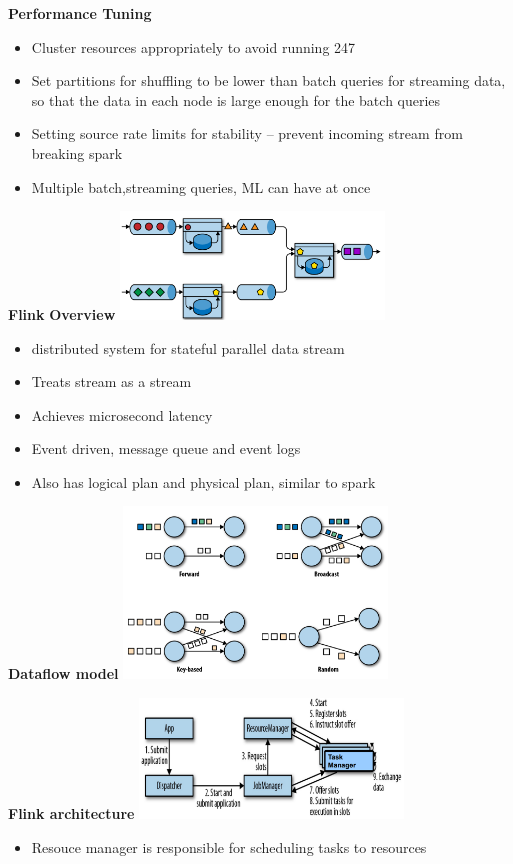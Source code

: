 \documentclass[10pt, landscape]{article}
\begin{document}
\begin{multicols}{4}
\textbf{Performance Tuning}
\begin{itemize}
  \item Cluster resources appropriately to avoid running 24\/7 
  \item Set partitions for shuffling to be lower than batch queries for streaming data, so that the data in each node is large enough for the batch queries 
  \item Setting source rate limits for stability -- prevent incoming stream from breaking spark
  \item Multiple batch,streaming queries, ML can have at once 
\end{itemize}



\textbf{Flink}
\textbf{Overview}
\includegraphics*[width=7cm]{flink.png}
\begin{itemize}
  \item distributed system for stateful parallel data stream
  \item Treats stream as a stream
  \item Achieves microsecond latency
  \item Event driven, message queue and event logs
  \item Also has logical plan and physical plan, similar to spark
\end{itemize}


\textbf{Dataflow model}
\includegraphics*[width=7cm]{dataflow.png}

\textbf{Flink architecture}
\includegraphics*[width=7cm]{flink_overview.png}
\begin{itemize}
  \item Resouce manager is responsible for scheduling tasks to resources
\end{itemize}


\end{multicols}
\end{document}
